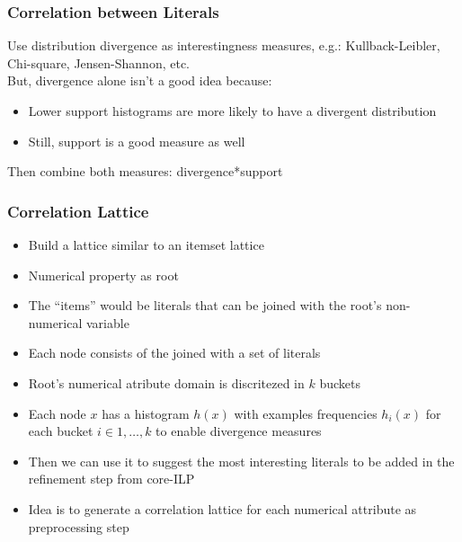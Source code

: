 \documentclass{beamer}
\begin{document}
\begin{frame}
\frametitle{Correlation between Literals}
  Use distribution divergence as interestingness measures, e.g.:
  \quad Kullback-Leibler, Chi-square, Jensen-Shannon, etc. \\
  But, divergence alone isn't a good idea because:
  \begin{itemize}
   \item Lower support histograms are more likely to have a divergent distribution
   \item Still, support is a good measure as well
  \end{itemize}
  Then combine both measures: divergence*support
\end{frame}

\begin{frame}
\frametitle{Correlation Lattice}
  \begin{itemize}
   \item Build a lattice similar to an itemset lattice 
   \item Numerical property as root 
   \item The ``items'' would be literals that can be joined with the root's non-numerical variable 
   \item Each node consists of the joined with a set of literals
   \item Root's numerical atribute domain is discritezed in $k$ buckets
   \item Each node $x$ has a histogram $h(x)$ with examples frequencies $h_i(x)$ for each bucket $i
\in {1,\ldots,k}$ to enable divergence measures 
   \item Then we can use it to suggest the most interesting literals to be added in the refinement step from core-ILP
   \item Idea is to generate a correlation lattice for each numerical attribute as preprocessing step 
  \end{itemize}
\end{frame}
\end{document}
